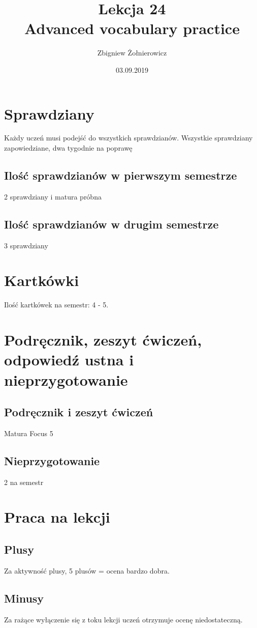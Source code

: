 \documentclass{article}
\begin{document}
\title{{\huge Lekcja 24} \\
{\large Advanced vocabulary practice}}
\author{Zbigniew Żołnierowicz}
\date{03.09.2019}
\maketitle
\section{Sprawdziany}
Każdy uczeń musi podejść do wszystkich sprawdzianów. Wszystkie sprawdziany zapowiedziane, dwa tygodnie na poprawę
\subsection{Ilość sprawdzianów w pierwszym semestrze}
2 sprawdziany i matura próbna
\subsection{Ilość sprawdzianów w drugim semestrze}
3 sprawdziany
\section{Kartkówki}
Ilość kartkówek na semestr: 4 - 5.
\section{Podręcznik, zeszyt ćwiczeń, odpowiedź ustna i nieprzygotowanie}
\subsection{Podręcznik i zeszyt ćwiczeń}
Matura Focus 5
\subsection{Nieprzygotowanie}
2 na semestr
\section{Praca na lekcji}
\subsection{Plusy}
Za aktywność plusy, 5 plusów = ocena bardzo dobra.
\subsection{Minusy}
Za rażące wyłączenie się z toku lekcji uczeń otrzymuje ocenę niedostateczną.
\end{document}
